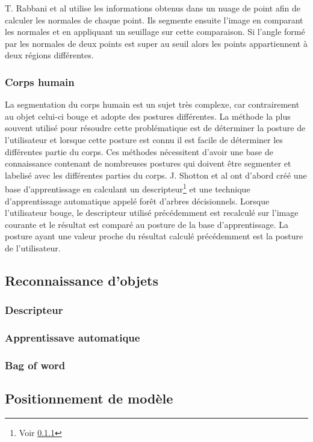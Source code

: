 T. Rabbani et al\cite{pointCloudSegmentation} utilise les informations obtenus dans un nuage de point afin 
de calculer les normales de chaque point. Ils segmente ensuite l'image en comparant les normales et en appliquant
un seuillage sur cette comparaison. Si l'angle formé par les normales de deux points est super au seuil alors
les points appartiennent à deux régions différentes.

\subsubsection{Corps humain}
La segmentation du corps humain est un sujet très complexe, car contrairement au objet celui-ci bouge et adopte
des postures différentes. La méthode la plus souvent utilisé pour résoudre cette problématique est de déterminer
la posture de l'utilisateur et lorsque cette posture est connu il est facile de déterminer les différentes partie
du corps. Ces méthodes nécessitent d'avoir une base de connaissance contenant de nombreuses postures qui doivent
être segmenter et labelisé avec les différentes parties du corps. J. Shotton et al\cite{kinectSegmentation} ont
d'abord créé une base d'apprentissage en calculant un descripteur\footnote{Voir \ref{descriptor}}
et une technique d'apprentissage automatique appelé forêt d'arbres décisionnels\cite{randomDecisionForest}. 
Lorsque l'utilisateur bouge, le descripteur utilisé précédemment est recalculé sur l'image courante et le résultat 
est comparé au posture de la base d'apprentissage. La posture ayant une valeur proche du résultat calculé précédemment 
est la posture de l'utilisateur.

\subsection{Reconnaissance d'objets}
\subsubsection{Descripteur}
\label{descriptor}
\subsubsection{Apprentissave automatique}
\subsubsection{Bag of word}

\subsection{Positionnement de modèle}
